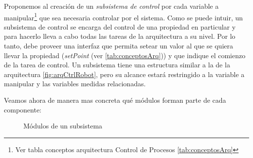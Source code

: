 Proponemos al creación de un \textit{subsistema de control} por cada variable a manipular\footnote{Ver tabla conceptos arquitectura Control de Procesos \ref{tab:conceptosArq}} que sea necesaria controlar por el sistema. Como se puede intuir, un subsistema de control se encarga del control de una propiedad en particular y para hacerlo lleva a cabo todas las tareas de la arquitectura a su nivel. Por lo tanto, debe proveer una interfaz que permita setear un valor al que se quiera llevar la propiedad (\textit{setPoint} (ver  \ref{tab:conceptosArq})) y que indique el comienzo de la tarea de control. Un subsistema tiene una estructura similar a la de la arquitectura \ref{fig:arqCtrlRobot}, pero su alcance estará restringido a la variable a manipular y las variables medidas relacionadas.


Veamos ahora de manera mas concreta qué módulos forman parte de cada componente:


\begin{figure}[h]
\caption{Módulos de un subsistema}
\begin{center}
\end{center}
\end{figure}

